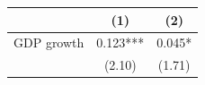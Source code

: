 \begin{tabular}{lcc}
\hline
 & (1) & (2) \\
\hline
GDP growth & 0.123*** & 0.045* \\
 & (2.10) & (1.71) \\
\hline
\end{tabular}

